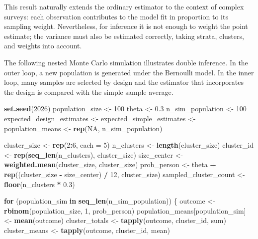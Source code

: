 \documentclass[
  english,
  12pt,
]{book}
\newenvironment{Shaded}{\begin{snugshade}}{\end{snugshade}}
\newcommand{\AttributeTok}[1]{\textcolor[rgb]{0.13,0.29,0.53}{#1}}
\newcommand{\ConstantTok}[1]{\textcolor[rgb]{0.56,0.35,0.01}{#1}}
\newcommand{\ControlFlowTok}[1]{\textcolor[rgb]{0.13,0.29,0.53}{\textbf{#1}}}
\newcommand{\DecValTok}[1]{\textcolor[rgb]{0.00,0.00,0.81}{#1}}
\newcommand{\FloatTok}[1]{\textcolor[rgb]{0.00,0.00,0.81}{#1}}
\newcommand{\FunctionTok}[1]{\textcolor[rgb]{0.13,0.29,0.53}{\textbf{#1}}}
\newcommand{\NormalTok}[1]{#1}
\newcommand{\OtherTok}[1]{\textcolor[rgb]{0.56,0.35,0.01}{#1}}
\newcommand{\SpecialCharTok}[1]{\textcolor[rgb]{0.81,0.36,0.00}{\textbf{#1}}}
\begin{document}
This result naturally extends the ordinary estimator to the context of complex surveys: each observation contributes to the model fit in proportion to its sampling weight. Nevertheless, for inference it is not enough to weight the point estimate; the variance must also be estimated correctly, taking strata, clusters, and weights into account.

The following nested Monte Carlo simulation illustrates double inference. In the outer loop, a new population is generated under the Bernoulli model. In the inner loop, many samples are selected by design and the estimator that incorporates the design is compared with the simple sample average.

\begin{Shaded}
\begin{Highlighting}[]
\FunctionTok{set.seed}\NormalTok{(}\DecValTok{2026}\NormalTok{)}
\NormalTok{population\_size }\OtherTok{\textless{}{-}} \DecValTok{100}
\NormalTok{theta }\OtherTok{\textless{}{-}} \FloatTok{0.3}
\NormalTok{n\_sim\_population }\OtherTok{\textless{}{-}} \DecValTok{100}
\NormalTok{expected\_design\_estimates }\OtherTok{\textless{}{-}}\NormalTok{ expected\_simple\_estimates }\OtherTok{\textless{}{-}}\NormalTok{ population\_means }\OtherTok{\textless{}{-}}
  \FunctionTok{rep}\NormalTok{(}\ConstantTok{NA}\NormalTok{, n\_sim\_population)}

\NormalTok{cluster\_size }\OtherTok{\textless{}{-}} \FunctionTok{rep}\NormalTok{(}\DecValTok{2}\SpecialCharTok{:}\DecValTok{6}\NormalTok{, }\AttributeTok{each =} \DecValTok{5}\NormalTok{)}
\NormalTok{n\_clusters }\OtherTok{\textless{}{-}} \FunctionTok{length}\NormalTok{(cluster\_size)}
\NormalTok{cluster\_id }\OtherTok{\textless{}{-}} \FunctionTok{rep}\NormalTok{(}\FunctionTok{seq\_len}\NormalTok{(n\_clusters), cluster\_size)}
\NormalTok{size\_center }\OtherTok{\textless{}{-}} \FunctionTok{weighted.mean}\NormalTok{(cluster\_size, cluster\_size)}
\NormalTok{prob\_person }\OtherTok{\textless{}{-}}\NormalTok{ theta }\SpecialCharTok{+} \FunctionTok{rep}\NormalTok{((cluster\_size }\SpecialCharTok{{-}}\NormalTok{ size\_center) }\SpecialCharTok{/} \DecValTok{12}\NormalTok{, cluster\_size)}
\NormalTok{sampled\_cluster\_count }\OtherTok{\textless{}{-}} \FunctionTok{floor}\NormalTok{(n\_clusters }\SpecialCharTok{*} \FloatTok{0.3}\NormalTok{)}

\ControlFlowTok{for}\NormalTok{ (population\_sim }\ControlFlowTok{in} \FunctionTok{seq\_len}\NormalTok{(n\_sim\_population)) \{}
\NormalTok{  outcome }\OtherTok{\textless{}{-}} \FunctionTok{rbinom}\NormalTok{(population\_size, }\DecValTok{1}\NormalTok{, prob\_person)}
\NormalTok{  population\_means[population\_sim] }\OtherTok{\textless{}{-}} \FunctionTok{mean}\NormalTok{(outcome)}
\NormalTok{  cluster\_totals }\OtherTok{\textless{}{-}} \FunctionTok{tapply}\NormalTok{(outcome, cluster\_id, sum)}
\NormalTok{  cluster\_means }\OtherTok{\textless{}{-}} \FunctionTok{tapply}\NormalTok{(outcome, cluster\_id, mean)}


\end{Highlighting}
\end{Shaded}
\end{document}
